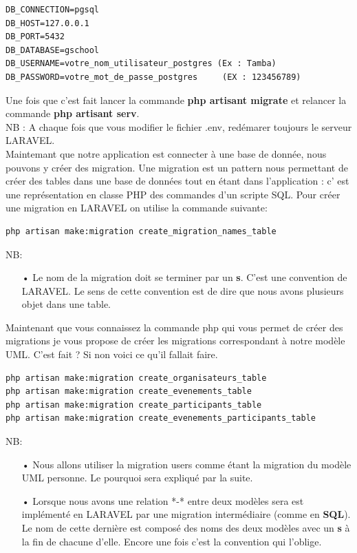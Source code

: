 \documentclass[12pt,a4paper]{article}
\begin{document}
\begin{verbatim}
DB_CONNECTION=pgsql 
DB_HOST=127.0.0.1
DB_PORT=5432
DB_DATABASE=gschool
DB_USERNAME=votre_nom_utilisateur_postgres (Ex : Tamba)
DB_PASSWORD=votre_mot_de_passe_postgres     (EX : 123456789)
\end{verbatim}
Une fois que c'est fait lancer la commande \textbf{php artisant migrate} et relancer la commande \textbf{php artisant serv}.\\
NB : A chaque fois que vous modifier le fichier .env, redémarer toujours le serveur LARAVEL.\\

Maintemant que notre application est connecter à une base de donnée, nous pouvons y créer des migration.
Une migration est un pattern nous permettant de créer des tables dans une base de données tout en étant dans l'application : c' est une représentation en classe PHP des commandes d'un scripte SQL.
Pour créer une migration en LARAVEL on utilise la commande suivante:
\begin{verbatim}
php artisan make:migration create_migration_names_table
\end{verbatim}
NB:
\begin{itemize}
\item[•]  Le nom de la migration doit se terminer par un \textbf{s}. C'est une convention de LARAVEL. Le sens
de cette convention est de dire que nous avons plusieurs objet dans une table. 
\end{itemize}

Maintenant que vous connaissez la commande php qui vous permet de créer des migrations je vous propose de créer les migrations correspondant à notre modèle UML.
C'est fait ? Si non voici ce qu'il fallait faire.
\begin{verbatim}
php artisan make:migration create_organisateurs_table
php artisan make:migration create_evenements_table
php artisan make:migration create_participants_table
php artisan make:migration create_evenements_participants_table
\end{verbatim}

NB:
\begin{itemize}
\item[•] Nous allons utiliser la migration users comme étant la migration du modèle UML personne. Le pourquoi sera expliqué par la suite.
\item[•] Lorsque nous avons une relation *-* entre deux modèles sera est implémenté en LARAVEL par une migration intermédiaire (comme en \textbf{SQL}). Le nom de cette dernière est composé des noms des deux modèles avec un \textbf{s} à la fin de 
chacune d'elle. Encore une fois c'est la convention qui l'oblige.
\end{itemize}
\end{document}
